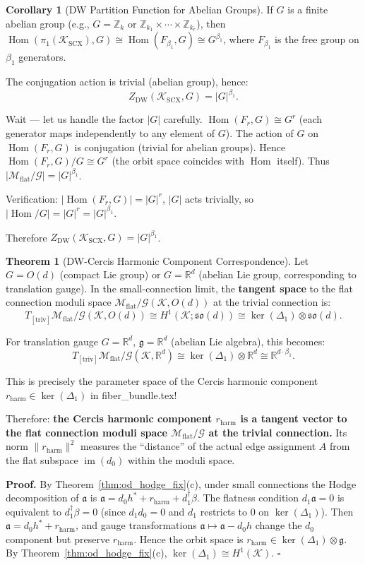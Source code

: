 \documentclass[12pt,a4paper]{article}
\theoremstyle{definition}
\newtheorem{theorem}{Theorem}[section]
\newtheorem{corollary}{Corollary}[section]
\theoremstyle{remark}
\theoremstyle{definition}
\newcommand{\R}{\mathbb{R}}
\newcommand{\Z}{\mathbb{Z}}
\newcommand{\Od}{O(d)}
\newcommand{\doneT}{d_1^\dagger}
\newcommand{\Lone}{\Delta_1}
\newcommand{\triv}{\mathrm{triv}}
\newcommand{\DW}{\mathrm{DW}}
\newcommand{\ZBetti}{\beta_1}
\newcommand{\Gflatquot}{\mathcal{M}_{\mathrm{flat}}/\mathcal{G}}
\DeclareMathOperator{\im}{im}
\DeclareMathOperator{\Hom}{Hom}
\begin{document}
\begin{corollary}[DW Partition Function for Abelian Groups]\label{cor:dw_abelian}
If $G$ is a finite abelian group (e.g., $G = \Z_k$ or $\Z_{k_1} \times \cdots \times \Z_{k_r}$),
then $\Hom(\pi_1(\mathcal{K}_{\text{SCX}}), G) \cong \Hom(F_{\ZBetti}, G) \cong G^{\ZBetti}$,
where $F_{\ZBetti}$ is the free group on $\ZBetti$ generators.

The conjugation action is trivial (abelian group), hence:
\[
    Z_{\DW}(\mathcal{K}_{\text{SCX}}, G) = |G|^{\ZBetti}.
\]

Wait — let us handle the factor $|G|$ carefully. $\Hom(F_r, G) \cong G^r$ (each generator maps independently to any element of $G$).
The action of $G$ on $\Hom(F_r, G)$ is conjugation (trivial for abelian groups).
Hence $\Hom(F_r, G)/G \cong G^r$ (the orbit space coincides with $\Hom$ itself).
Thus $|\Gflatquot| = |G|^{\ZBetti}$.

Verification: $|\Hom(F_r, G)| = |G|^r$, $|G|$ acts trivially, so $|\Hom/G| = |G|^r = |G|^{\ZBetti}$.

Therefore $Z_{\DW}(\mathcal{K}_{\text{SCX}}, G) = |G|^{\ZBetti}$.
\end{corollary}

\begin{theorem}[DW-Cercis Harmonic Component Correspondence]\label{thm:dw_cercis_correspondence}
Let $G = \Od$ (compact Lie group) or $G = \R^d$ (abelian Lie group, corresponding to translation gauge).
In the small-connection limit, the \textbf{tangent space} to the flat connection moduli space $\Gflatquot(\mathcal{K}, \Od)$ at the trivial connection is:
\[
    T_{[\triv]}\Gflatquot(\mathcal{K}, \Od) \cong H^1(\mathcal{K}; \mathfrak{so}(d))
    \cong \ker(\Lone) \otimes \mathfrak{so}(d).
\]

For translation gauge $G = \R^d$, $\mathfrak{g} = \R^d$ (abelian Lie algebra), this becomes:
\[
    T_{[\triv]}\Gflatquot(\mathcal{K}, \R^d) \cong \ker(\Lone) \otimes \R^d
    \cong \R^{d \cdot \ZBetti}.
\]

This is precisely the parameter space of the Cercis harmonic component $r_{\text{harm}} \in \ker(\Lone)$ in fiber\_bundle.tex!

Therefore: \textbf{the Cercis harmonic component $r_{\text{harm}}$ is a tangent vector to the flat connection moduli space $\Gflatquot$ at the trivial connection.}
Its norm $\|r_{\text{harm}}\|^2$ measures the ``distance'' of the actual edge assignment $A$ from the flat subspace $\im(d_0)$ within the moduli space.

\textbf{Proof.} By Theorem~\ref{thm:od_hodge_fix}(c), under small connections the Hodge decomposition of $\mathfrak{a}$ is
$\mathfrak{a} = d_0 h^* + r_{\text{harm}} + \doneT \beta$.
The flatness condition $d_1 \mathfrak{a} = 0$ is equivalent to $\doneT \beta = 0$ (since $d_1 d_0 = 0$ and $d_1$ restricts to 0 on $\ker(\Lone)$).
Then $\mathfrak{a} = d_0 h^* + r_{\text{harm}}$, and gauge transformations $\mathfrak{a} \mapsto \mathfrak{a} - d_0 h$ change the $d_0$ component but preserve $r_{\text{harm}}$.
Hence the orbit space is $r_{\text{harm}} \in \ker(\Lone) \otimes \mathfrak{g}$.
By Theorem~\ref{thm:od_hodge_fix}(c), $\ker(\Lone) \cong H^1(\mathcal{K})$. $\square$
\end{theorem}
\end{document}
